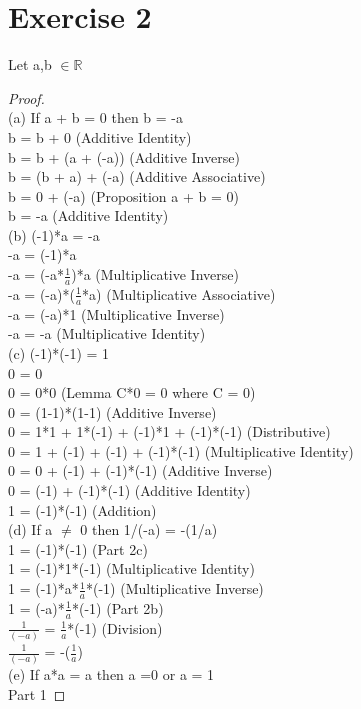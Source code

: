 \documentclass[12pt]{article}
\theoremstyle{definition}
\numberwithin{equation}{subsection}
\begin{document}
\section{Exercise 2}
Let a,b $\in \mathbb{R}$
\begin{proof}
\\ (a) If a + b = 0 then b = -a
\\ b = b + 0 (Additive Identity)
\\ b = b + (a + (-a)) (Additive Inverse)
\\ b = (b + a) + (-a) (Additive Associative)
\\ b = 0 + (-a) (Proposition a + b = 0)
\\ b = -a (Additive Identity)
\\ (b) (-1)*a = -a
\\ -a = (-1)*a
\\ -a = (-a*$\frac{1}{a}$)*a (Multiplicative Inverse)
\\ -a = (-a)*($\frac{1}{a}$*a) (Multiplicative Associative)
\\ -a = (-a)*1 (Multiplicative Inverse)
\\ -a = -a (Multiplicative Identity)
\\ (c) (-1)*(-1) = 1
\\ 0 = 0
\\ 0 = 0*0 (Lemma C*0 = 0 where C = 0)
\\ 0 = (1-1)*(1-1) (Additive Inverse)
\\ 0 = 1*1 + 1*(-1) + (-1)*1 + (-1)*(-1) (Distributive)
\\ 0 = 1 + (-1) + (-1) + (-1)*(-1) (Multiplicative Identity)
\\ 0 = 0 + (-1) + (-1)*(-1) (Additive Inverse)
\\ 0 = (-1) + (-1)*(-1) (Additive Identity)
\\ 1 = (-1)*(-1) (Addition)
\\ (d) If a $\neq$ 0 then 1/(-a) = -(1/a)
\\ 1 = (-1)*(-1) (Part 2c)
\\ 1 = (-1)*1*(-1) (Multiplicative Identity)
\\ 1 = (-1)*a*$\frac{1}{a}$*(-1) (Multiplicative Inverse)
\\ 1 = (-a)*$\frac{1}{a}$*(-1) (Part 2b)
\\ $\frac{1}{(-a)}$ = $\frac{1}{a}$*(-1) (Division)
\\ $\frac{1}{(-a)}$ = -($\frac{1}{a}$) 
\\ (e) If a*a = a then a =0 or a = 1
\\ Part 1

\end{proof}
\end{document}
